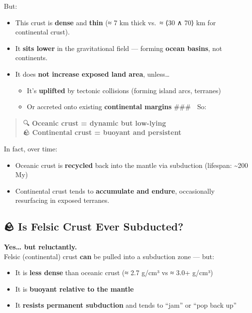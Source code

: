\documentclass[
  letterpaper,
]{book}
\providecommand{\tightlist}{%
  \setlength{\itemsep}{0pt}\setlength{\parskip}{0pt}}
\begin{document}
But:

\begin{itemize}
\tightlist
\item
  This crust is \textbf{dense} and \textbf{thin} (≈ 7 km thick vs.~≈ ⟨30
  ∧ 70⟩ km for continental crust).\\
\item
  It \textbf{sits lower} in the gravitational field --- forming
  \textbf{ocean basins}, not continents.\\
\item
  It does \textbf{not increase exposed land area}, unless\ldots{}

  \begin{itemize}
  \tightlist
  \item
    It's \textbf{uplifted} by tectonic collisions (forming island arcs,
    terranes)\\
  \item
    Or accreted onto existing \textbf{continental margins} \#\#\# 🔸 So:
  \end{itemize}
\end{itemize}

\begin{quote}
🔍 \textbf{Oceanic crust = dynamic but low-lying}\\
🪨 \textbf{Continental crust = buoyant and persistent}
\end{quote}

In fact, over time:

\begin{itemize}
\tightlist
\item
  Oceanic crust is \textbf{recycled} back into the mantle via subduction
  (lifespan: \textasciitilde200 My)\\
\item
  Continental crust tends to \textbf{accumulate and endure},
  occasionally resurfacing in exposed terranes.
\end{itemize}

\subsection{🪨 Is Felsic Crust Ever
Subducted?}\label{is-felsic-crust-ever-subducted}

\textbf{Yes\ldots{} but reluctantly.}\\
Felsic (continental) crust \textbf{can} be pulled into a subduction zone
--- but:

\begin{itemize}
\tightlist
\item
  It is \textbf{less dense} than oceanic crust (≈ 2.7 g/cm³ vs ≈ 3.0+
  g/cm³)\\
\item
  It is \textbf{buoyant relative to the mantle}\\
\item
  It \textbf{resists permanent subduction} and tends to ``jam'' or ``pop
  back up''
\end{itemize}
\end{document}
